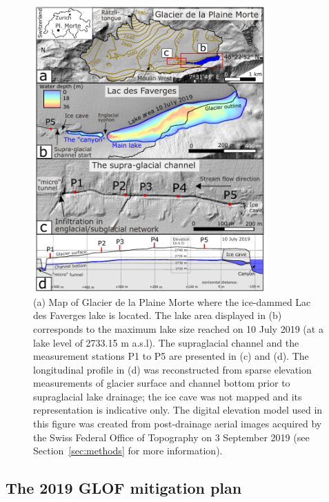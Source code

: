 \begin{figure}[H]
    \centering
    \includegraphics[width=0.8\textwidth]{chapters/chapter_plainemorte/fig01.pdf}
    \caption{(a) Map of Glacier de la Plaine Morte where the
      ice-dammed Lac des Faverges lake is located. The lake area
      displayed in (b) corresponds to the maximum lake size reached on
      10 July 2019 (at a lake level of 2733.15 m a.s.l). The
      supraglacial channel and the measurement stations P1 to P5 are
      presented in (c) and (d). The longitudinal profile in (d) was
      reconstructed from sparse elevation measurements of glacier
      surface and channel bottom prior to supraglacial lake
      drainage; the ice cave was not mapped and its representation is indicative only. The digital elevation model used in this figure was
      created from post-drainage aerial images acquired by the Swiss
      Federal Office of Topography on 3 September 2019 (see
      Section~\ref{sec:methods} for more information).}
    \label{fig:study_area}
\end{figure}

\subsection{The 2019 GLOF mitigation plan}

